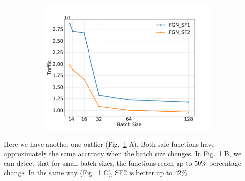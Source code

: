 \begin{figure}[H]
\begin{subfigure}[b]{0.50\textwidth}
        \includegraphics[width=\textwidth]{./images/results/sf-comp/exp_Fig_2_3.png}
        \caption{}
    \end{subfigure}
    \caption{}
    \label{fig:sf_2}
\end{figure}

Here we have another one outlier (Fig.~\ref{fig:sf_2} A).
Both safe functions have approximately the same accuracy when the batch size changes.
In Fig.~\ref{fig:sf_2} B, we can detect that for small batch sizes, the functions reach up to $50\%$ percentage change.
In the same way (Fig.~\ref{fig:sf_2} C), SF2 is better up to $42\%$.

